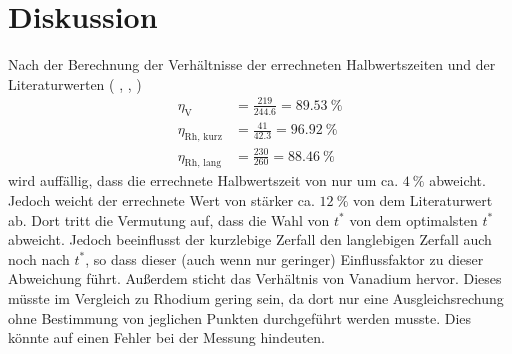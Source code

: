 \section{Diskussion}
\label{sec:Diskussion}
Nach der Berechnung der Verhältnisse der errechneten Halbwertszeiten und der Literaturwerten
( \cite{rh104},  \cite{rh104i},  \cite{vana}) 
\begin{align*}
  \eta_\text{V}       &=   \frac{219}{244.6} = \SI{89.53}{\percent} \\
  \eta_\text{Rh, kurz} &=   \frac{41}{42.3}  = \SI{96.92}{\percent} \\
  \eta_\text{Rh, lang} &=   \frac{230}{260}  = \SI{88.46}{\percent} 
\end{align*}
wird auffällig, dass die errechnete Halbwertszeit von  nur um ca. $\SI{4}{\percent}$ abweicht.
Jedoch weicht der errechnete Wert von  stärker {ca. $\SI{12}{\percent}$} von dem Literaturwert ab.
Dort tritt die Vermutung auf, dass die Wahl von $t^*$ von dem optimalsten $t^*$ abweicht.
Jedoch beeinflusst der kurzlebige Zerfall den langlebigen Zerfall auch noch nach $t^*$, so dass dieser (auch wenn nur geringer) Einflussfaktor
zu dieser Abweichung führt. Außerdem sticht das Verhältnis von Vanadium hervor.
Dieses müsste im Vergleich zu Rhodium gering sein, da dort nur eine Ausgleichsrechung ohne Bestimmung von jeglichen Punkten 
durchgeführt werden musste. Dies könnte auf einen Fehler bei der Messung hindeuten.
